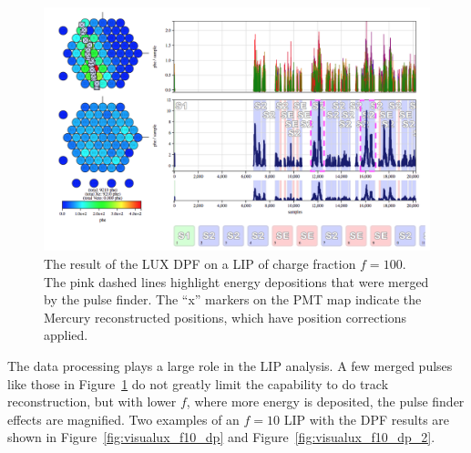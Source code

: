 \begin{figure}[htbp]
\begin{center}
\includegraphics[width=\textwidth]{figures/lips/visualux_f100_dp.png}
\caption{The result of the \acs{LUX} \acs{DPF} on a \acs{LIP} of charge fraction $f=100$. The pink dashed lines highlight energy depositions that were merged by the pulse finder. The ``x'' markers on the \acs{PMT} map indicate the Mercury reconstructed positions, which have position corrections applied. }
\label{fig:visualux_f100_dp}
\end{center}
\end{figure}

The data processing plays a large role in the \ac{LIP} analysis. A few merged pulses like those in Figure~\ref{fig:visualux_f100_dp} do not greatly limit the capability to do track reconstruction, but with lower $f$, where more energy is deposited, the pulse finder effects are magnified. Two examples of an $f=10$ \ac{LIP} with the \ac{DPF} results are shown in Figure~\ref{fig:visualux_f10_dp} and Figure~\ref{fig:visualux_f10_dp_2}. 

